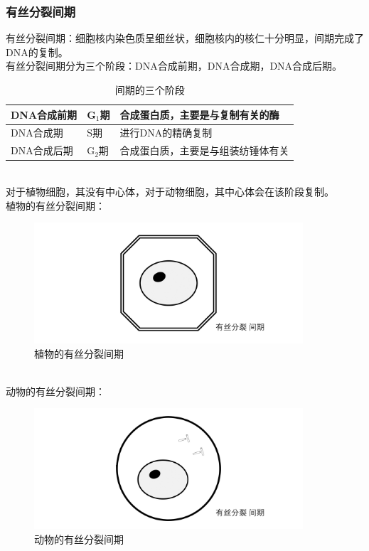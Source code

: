 \documentclass[UTF8]{ctexart}
\begin{document}
\newpage

\subsubsection{有丝分裂间期}
    有丝分裂间期：细胞核内染色质呈细丝状，细胞核内的核仁十分明显，间期完成了DNA的复制。\\[3mm]
    有丝分裂间期分为三个阶段：DNA合成前期，DNA合成期，DNA合成后期。\vspace{5pt}
    \begin{table}[h]
        \begin{center}
            \begin{tabular}{l|l|l}
                \hline
                DNA合成前期\qquad\qquad&G$_1$期\qquad\qquad&合成蛋白质，主要是与复制有关的酶\qquad\qquad\\ \hline
                DNA合成期\qquad\qquad&S期\qquad\qquad&进行DNA的精确复制\qquad\qquad\\ \hline
                DNA合成后期\qquad\qquad&G$_2$期\qquad\qquad&合成蛋白质，主要是与组装纺锤体有关\qquad\qquad\\ \hline
            \end{tabular}
            \caption{间期的三个阶段}
        \end{center}
    \end{table}\\
    对于植物细胞，其没有中心体，对于动物细胞，其中心体会在该阶段复制。\\[6mm]
    植物的有丝分裂间期：
    \begin{figure}[h]
        \begin{center}
            \includegraphics[width=10cm]{BiologyImage/24.jpg}
            \caption{植物的有丝分裂间期}
        \end{center}
    \end{figure}\\
    动物的有丝分裂间期：
    \begin{figure}[h]
        \begin{center}
            \includegraphics[width=10cm]{BiologyImage/29.jpg}
            \caption{动物的有丝分裂间期}
        \end{center}
    \end{figure}\\
\end{document}
